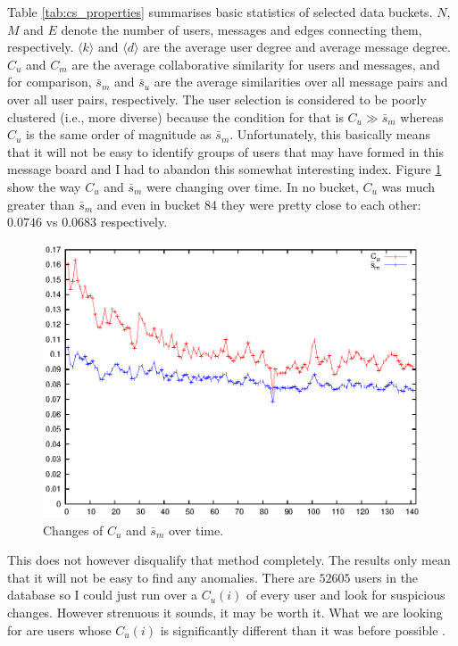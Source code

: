       Table \ref{tab:cs_properties} summarises basic statistics of selected data buckets. $N$, $M$ and $E$ denote the number of users, messages and edges connecting them, respectively. $\langle k \rangle$ and $\langle d \rangle$ are the average user degree and average message degree. $C_u$ and $C_m$ are the average collaborative similarity for users and messages, and for comparison, $\bar s_m$ and $\bar s_u$ are the average similarities over all message pairs and over all user pairs, respectively. The user selection is considered to be poorly clustered (i.e., more diverse) because the condition for that is $C_u \gg \bar s_m$ whereas $C_u$ is the same order of magnitude as $\bar s_m$. Unfortunately, this basically means that it will not be easy to identify groups of users that may have formed in this message board and I had to abandon this somewhat interesting index. Figure \ref{fig:cs_cusm} show the way $C_u$ and $\bar s_m$ were changing over time. In no bucket, $C_u$ was much greater than $\bar s_m$ and even in bucket 84 they were pretty close to each other: $0.0746$ vs $0.0683$ respectively.
      \begin{figure}[h]
        \includegraphics[width=\textwidth]{chapters/03_implementation/C_us_m}
        \caption{Changes of $C_u$ and $\bar s_m$ over time.}
        \label{fig:cs_cusm}
      \end{figure}
      
      This does not however disqualify that method completely. The results only mean that it will not be easy to find any anomalies. There are $52605$ users in the database so I could just run over a $C_u(i)$ of every user and look for suspicious changes. However strenuous it sounds, it may be worth it. What we are looking for are users whose $C_u(i)$ is significantly different than it was before possible .
      
